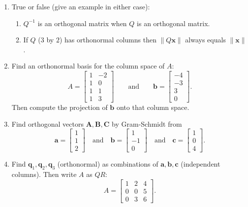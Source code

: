\documentclass[14pt, a4paper]{article}
\begin{document}
\begin{enumerate}[resume]
    \item True or false (give an example in either case):
          \begin{enumerate}
              \item $Q^{-1}$ is an orthogonal matrix when $Q$ is an orthogonal matrix.
              \item If $Q$ ($3$ by $2$) has orthonormal columns then $\|Q\boldsymbol{x}\|$ always equals $\|\boldsymbol{x}\|$.
          \end{enumerate}

    \item Find an orthonormal basis for the column space of $A$:
          \[
              A = \begin{bmatrix} 1 & -2 \\ 1 & 0 \\ 1 & 1 \\ 1 & 3 \end{bmatrix} \qquad \text{and} \qquad \boldsymbol{b} = \begin{bmatrix} -4 \\ -3 \\ 3 \\ 0 \end{bmatrix}.
          \]
          Then compute the projection of $\boldsymbol{b}$ onto that column space.

    \item Find orthogonal vectors $\boldsymbol{A}, \boldsymbol{B}, \boldsymbol{C}$ by Gram-Schmidt from
          \[
              \boldsymbol{a} = \begin{bmatrix} 1 \\ 1 \\ 2 \end{bmatrix} \quad \text{and} \quad \boldsymbol{b} = \begin{bmatrix} 1 \\ -1 \\ 0 \end{bmatrix} \quad \text{and} \quad \boldsymbol{c} = \begin{bmatrix} 1 \\ 0 \\ 4 \end{bmatrix}.
          \]

    \item Find $\boldsymbol{q}_1, \boldsymbol{q}_2, \boldsymbol{q}_3$ (orthonormal) as combinations of $\boldsymbol{a}, \boldsymbol{b}, \boldsymbol{c}$ (independent columns). Then write $A$ as $QR$:
          \[
              A = \begin{bmatrix} 1 & 2 & 4 \\ 0 & 0 & 5 \\ 0 & 3 & 6 \end{bmatrix}.
          \]


\end{enumerate}
\end{document}

